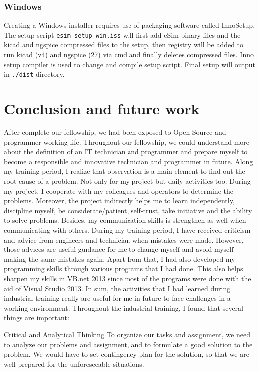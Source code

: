 \documentclass[12pt,a4paper]{report}
\begin{document}
\subsection{Windows}
Creating a Windows installer requires use of packaging software called InnoSetup.
\\
The setup script \texttt{esim-setup-win.iss} will first add eSim binary files and the kicad and ngspice compressed files to the setup, then registry will be added to run kicad (v4) and ngspice (27) via cmd and finally deletes compressed files. Inno setup compiler is used to change and compile setup script. Final setup will output in \texttt{./dist} directory.


\chapter{\textbf{Conclusion and future work}}
After complete our fellowship, we had been exposed to Open-Source and programmer working life. Throughout our fellowship, we could understand more about the definition of an IT technician and programmer and prepare myself to become a responsible and innovative technician and programmer in future. Along my training period, I realize that observation is a main element to find out the root cause of a problem. Not only for my project but daily activities too. During my project, I cooperate with my colleagues and operators to determine the problems. Moreover, the project indirectly helps me to learn independently, discipline myself, be considerate/patient, self-trust, take initiative and the ability to solve problems. Besides, my communication skills is strengthen as well when communicating with others. During my training period, I have received criticism and advice from engineers and technician when mistakes were made. However, those advices are useful guidance for me to change myself and avoid myself making the same mistakes again. Apart from that, I had also developed my programming skills through various programs that I had done. This also helps sharpen my skills in VB.net 2013 since most of the programs were done with the aid of Visual Studio 2013. In sum, the activities that I had learned during industrial training really are useful for me in future to face challenges in a working environment. Throughout the industrial training, I found that several things are important: 

Critical and Analytical Thinking
To organize our tasks and assignment, we need to analyze our problems and assignment, and to formulate a good solution to the problem. We would have to set contingency plan for the solution, so that we are well prepared for the unforeseeable situations. 
\end{document}
